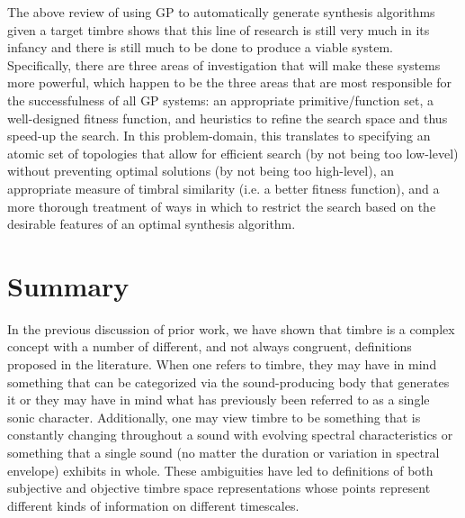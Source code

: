 \documentclass[a4paper,12pt]{report} 	%
\numberwithin{figure}{chapter}
\numberwithin{table}{chapter}
\numberwithin{equation}{chapter}
\begin{document}
\begin{flushleft}
The above review of using GP to automatically generate synthesis algorithms given a target timbre shows that this line of research is still very much in its infancy and there is still much to be done to produce a viable system. Specifically, there are three areas of investigation that will make these systems more powerful, which happen to be the three areas that are most responsible for the successfulness of all GP systems: an appropriate primitive/function set, a well-designed fitness function, and heuristics to refine the search space and thus speed-up the search. In this problem-domain, this translates to specifying an atomic set of topologies that allow for efficient search (by not being too low-level) without preventing optimal solutions (by not being too high-level), an appropriate measure of timbral similarity (i.e. a better fitness function), and a more thorough treatment of ways in which to restrict the search based on the desirable features of an optimal synthesis algorithm.

\section{Summary}
In the previous discussion of prior work, we have shown that timbre is a complex concept with a number of different, and not always congruent, definitions proposed in the literature. When one refers to timbre, they may have in mind something that can be categorized via the sound-producing body that generates it or they may have in mind what has previously been referred to as a single sonic character. Additionally, one may view timbre to be something that is constantly changing throughout a sound with evolving spectral characteristics or something that a single sound (no matter the duration or variation in spectral envelope) exhibits in whole. These ambiguities have led to definitions of both subjective and objective timbre space representations whose points represent different kinds of information on different timescales.


\end{flushleft}
\end{document}
